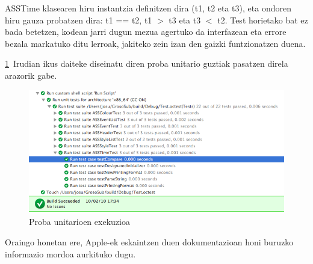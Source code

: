 ASSTime klasearen hiru instantzia definitzen dira (t1, t2 eta t3), eta ondoren hiru gauza probatzen dira: t1 == t2, t1 $>$ t3 eta t3 $<$ t2. Test horietako bat ez bada betetzen, kodean jarri dugun mezua agertuko da interfazean eta errore bezala markatuko ditu lerroak, jakiteko zein izan den gaizki funtzionatzen duena.

\ref{ocunit}~Irudian ikus daiteke diseinatu diren proba unitario guztiak pasatzen direla arazorik gabe.
\begin{figure}[htp]
\begin{center}
\includegraphics[scale=0.6]{Pictures/Chapter4/Probak/ocunit.png}
\caption{Proba unitarioen exekuzioa}
\label{ocunit}
\end{center}
\end{figure}

Oraingo honetan ere, Apple-ek eskaintzen duen dokumentazioan\cite{ap:ocu} honi buruzko informazio mordoa aurkituko dugu.

